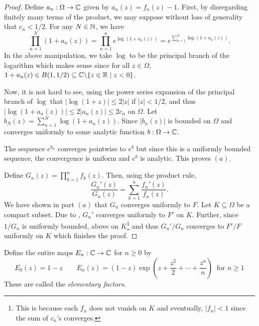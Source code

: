 \begin{proof}
    Define $a_n:\Omega\to\mathbb{C}$ given by $a_n(z) = f_n(z) - 1$. First, by disregarding finitely many terms of the product, we may suppose without loss of generality that $c_n < 1/2$. For any $N\in\mathbb{N}$, we have 
    \begin{equation*}
        \prod_{n = 1}^N(1 + a_n(z)) = \prod_{n = 1}^ne^{\log(1 + a_n(z))} = e^{\sum_{n = 1}^N\log(1 + a_n(z))}.
    \end{equation*}
    In the above manipulation, we take $\log$ to be the principal branch of the logarithm which makes sense since for all $z\in\Omega$, $1 + a_n(z)\in B(1,1/2)\subseteq\mathbb{C}\backslash\{z\in\mathbb{R}\mid z < 0\}$.

    Now, it is not hard to see, using the power series expansion of the principal branch of $\log$ that $|\log(1 + z)|\le 2|z|$ if $|z| < 1/2$, and thus $|\log(1 + a_n(z))|\le 2|a_n(z)|\le 2c_n$ on $\Omega$. Let $b_N(z) = \sum_{n = 1}^N\log(1 + a_n(z))$. Since $|b_n(z)|$ is bounded on $\Omega$ and converges uniformly to some analytic function $b:\Omega\to\mathbb{C}$.

    The sequence $e^{b_n}$ converges pointwise to $e^b$ but since this is a uniformly bounded sequence, the convergence is uniform and $e^b$ is analytic. This proves $(a)$.

    Define $G_n(z) = \prod_{k = 1}^nf_k(z)$. Then, using the product rule,
    \begin{equation*}
        \frac{G_n'(z)}{G_n(z)} = \sum_{k = 1}^n\frac{f_n'(z)}{f_n(z)}.
    \end{equation*}
    We have shown in part $(a)$ that $G_n$ converges uniformly to $F$. Let $K\subseteq\Omega$ be a compact subset. Due to , $G_n'$ converges uniformly to $F'$ on $K$. Further, since $1/G_n$ is uniformly bounded, above on $K$\footnote{This is because each $f_n$ does not vanish on $K$ and eventually, $|f_n| < 1$ since the sum of $c_n$'s converges.} and thus $G_n'/G_n$ converges to $F'/F$ uniformly on $K$ which finishes the proof.
\end{proof}

\begin{definition}
    Define the entire maps $E_n:\mathbb{C}\to\mathbb{C}$ for $n\ge 0$ by 
    \begin{equation*}
        E_0(z) = 1 - z \qquad E_n(z) = (1 - z)\exp\left(z + \frac{z^2}{2} + \cdots + \frac{z^n}{n}\right)~\text{ for } n\ge 1
    \end{equation*}
    These are called the \emph{elementary factors}.
\end{definition}

